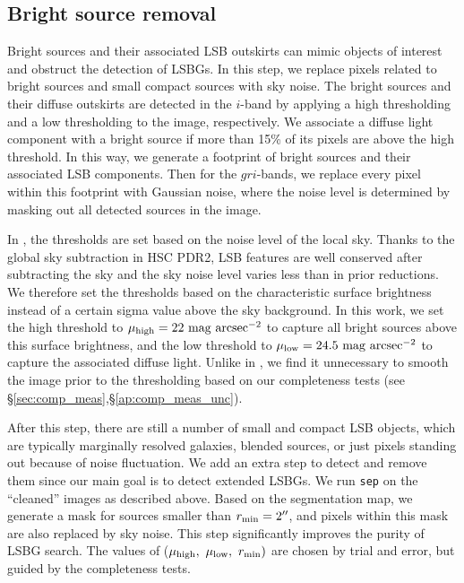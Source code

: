 \documentclass[twocolumn,astrosymb,twocolappendix,linenumbers]{aastex631}
\newcommand{\sbunit}{\mathrm{mag\ arcsec}^{-2}}
\newcommand{\code}[1]{\texttt{#1}}
\begin{document}
\begin{CJK*}{UTF8}{gbsn}
\subsection{Bright source removal}
Bright sources and their associated LSB outskirts can mimic objects of interest and obstruct the detection of LSBGs. In this step, we replace pixels related to bright sources and small compact sources with sky noise. The bright sources and their diffuse outskirts are detected in the $i$-band by applying a high thresholding and a low thresholding to the image, respectively. We associate a diffuse light component with a bright source if more than 15\% of its pixels are above the high threshold. In this way, we generate a footprint of bright sources and their associated LSB components. Then for the $gri$-bands, we replace every pixel within this footprint with Gaussian noise, where the noise level is determined by masking out all detected sources in the image. 
    
In , the thresholds are set based on the noise level of the local sky. Thanks to the global sky subtraction in HSC PDR2, LSB features are well conserved after subtracting the sky and the sky noise level varies less than in prior reductions. We therefore set the thresholds based on the characteristic surface brightness instead of a certain sigma value above the sky background. In this work, we set the high threshold to $\mu_{\rm high} = 22\ \sbunit$ to capture all bright sources above this surface brightness, and the low threshold to $\mu_{\rm low} = 24.5\ \sbunit$ to capture the associated diffuse light. Unlike in , we find it unnecessary to smooth the image prior to the thresholding based on our completeness tests (see \S \ref{sec:comp_meas},\S\ref{ap:comp_meas_unc}).   

After this step, there are still a number of small and compact LSB objects, which are typically marginally resolved galaxies, blended sources, or just pixels standing out because of noise fluctuation. We add an extra step to detect and remove them since our main goal is to detect extended LSBGs. We run \code{sep} on the ``cleaned'' images as described above. Based on the segmentation map, we generate a mask for sources smaller than $r_{\rm min} = 2\mbox{$^{\prime\prime}$}$, and pixels within this mask are also replaced by sky noise. This step significantly improves the purity of LSBG search. The values of ($\mu_{\rm high},\ \mu_{\rm low},\ r_{\rm min})$ are chosen by trial and error, but guided by the completeness tests. 
    

\end{CJK*}
\end{document}

